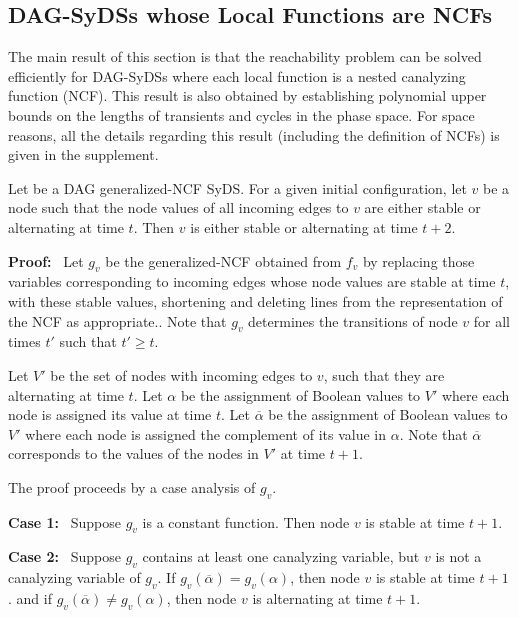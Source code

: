 \subsection{DAG-SyDSs whose Local Functions are NCFs}
\label{ssec:ncfs}

The main result of this section is that the reachability
problem can be solved efficiently for DAG-SyDSs where each
local function is a nested canalyzing function (NCF).
This result is also obtained by establishing polynomial
upper bounds on the lengths of transients and cycles in
the phase space.
For space reasons, all the details regarding
this result (including the definition of NCFs) 
is given in the supplement.

\iffalse
\begin{lemma}\label{lem:ncf_plus_two}
Let \cals{} be a DAG generalized-NCF SyDS.
For a given initial configuration,
let $v$ be a node such that the node values of all incoming edges to $v$
are  either stable or alternating at time $t$.
Then  $v$ is either stable or alternating at time $t+2$.
\end{lemma}

\noindent
\textbf{Proof:}~ Let $g_v$ be the generalized-NCF obtained from $f_v$  
by replacing those variables corresponding to incoming edges 
whose node values are stable at time $t$,
with these stable values,
shortening and deleting lines from the representation of the NCF as appropriate.. 
Note that $g_v$ determines the transitions of node $v$ for all times $t'$ such that $t' \geq t$.

Let $V'$ be the set of nodes with incoming edges to $v$, such that they are alternating at time $t$.
Let $\alpha$  be the assignment of Boolean values to $V'$ 
where each node  is assigned its value at time $t$.
Let $\overline{\alpha}$  be the assignment of Boolean values to $V'$ 
where each node  is assigned the complement of its value in $\alpha$.
Note that $\overline{\alpha}$ corresponds to the values of the nodes in $V'$ at time $t+1$.


The proof proceeds by a case analysis of $g_v$.

\noindent
\textbf{Case 1:}~ Suppose $g_v$ is a constant function.
Then node $v$ is stable at time $t+1$.

\noindent
\textbf{Case 2:}~ Suppose $g_v$ contains at least one canalyzing variable, 
but $v$ is not a canalyzing variable of $g_v$.
If $g_v(\overline{\alpha}) = g_v(\alpha)$, then node $v$ is stable at time $t+1$.
and if $g_v(\overline{\alpha}) \neq g_v(\alpha)$, 
then node $v$ is alternating at time $t+1$.

